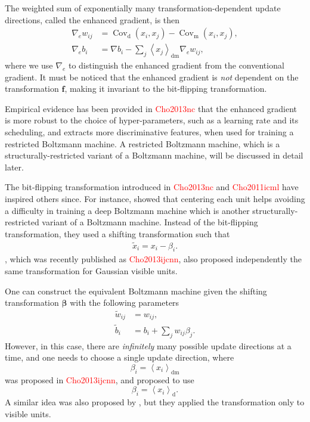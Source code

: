 \documentclass{now}
\newcommand{\vect}[1]{\mathbf{#1}}
\newcommand{\vects}[1]{\boldsymbol{#1}}
\newcommand{\cov}[0]{\operatorname{Cov}}
\newcommand{\vf}[0]{\vect{f}}
\newcommand{\td}[0]{\text{d}}
\newcommand{\vbeta}[0]{\vects{\beta}}
\newcommand{\tf}[0]{\text{m}}
\newcommand{\tdf}[0]{\text{dm}}
\newcommand{\alert}[1]{\textcolor{red}{#1}}
\newcommand{\citepub}[1]{\alert{#1}}
\begin{document}
The weighted sum of exponentially many
transformation-dependent update directions, called the
enhanced gradient, is then
\begin{align}
    \label{eq:enh_w}
  \nabla_e w_{ij} &=  \cov_\td(x_i,x_j)-\cov_\tf(x_i,x_j),
  \\
    \label{eq:enh_b}
  \nabla_e b_i &= \nabla b_i - \sum_j
  \left<x_j\right>_\tdf\nabla_e w_{ij},
\end{align}
where we use $\nabla_e$ to distinguish the enhanced gradient
from the conventional gradient. It must be noticed that the
enhanced gradient is \textit{not} dependent on the
transformation $\vf$, making it invariant to the
bit-flipping transformation.

Empirical evidence has been provided in \citepub{Cho2013nc}
that the enhanced gradient is more robust to the choice of
hyper-parameters, such as a learning rate and its
scheduling, and extracts more discriminative features, when
used for training a restricted Boltzmann machine. A
restricted Boltzmann machine, which is a
structurally-restricted variant of a Boltzmann machine, will
be discussed in detail later.

The bit-flipping transformation introduced in
\citepub{Cho2013nc} and \citepub{Cho2011icml} have inspired
others since.  For instance, \citet{Montavon2012} showed
that centering each unit helps avoiding a difficulty in
training a deep Boltzmann machine which is another
structurally-restricted variant of a Boltzmann machine.
Instead of the bit-flipping transformation, they used a
shifting transformation such that
\begin{align*}
    \tilde{x}_i  = x_i - \beta_i.
\end{align*}
\citet{Cho2011dlufl}, which was recently published as
\citepub{Cho2013ijcnn}, also proposed independently the same
transformation for Gaussian visible units.

One can construct
the equivalent Boltzmann machine 
given the shifting transformation $\vbeta$ 
with the following parameters
\begin{align*}
    \tilde{w}_{ij} &= w_{ij}, \\
    \tilde{b}_i &= b_i + \sum_{j} w_{ij} \beta_j.
\end{align*}
However, in this case, there are \textit{infinitely} many
possible update directions at a time, and one needs to
choose a single update direction, where 
\[
\beta_i = \left< x_i \right>_\tdf
\]
was proposed in \citepub{Cho2013ijcnn}, and 
\citet{Montavon2012}
proposed to use 
\[
\beta_i = \left< x_i \right>_\td.
\]
A similar idea was also proposed by \citet{Tang2011}, but
they applied the transformation only to visible units.
\end{document}
